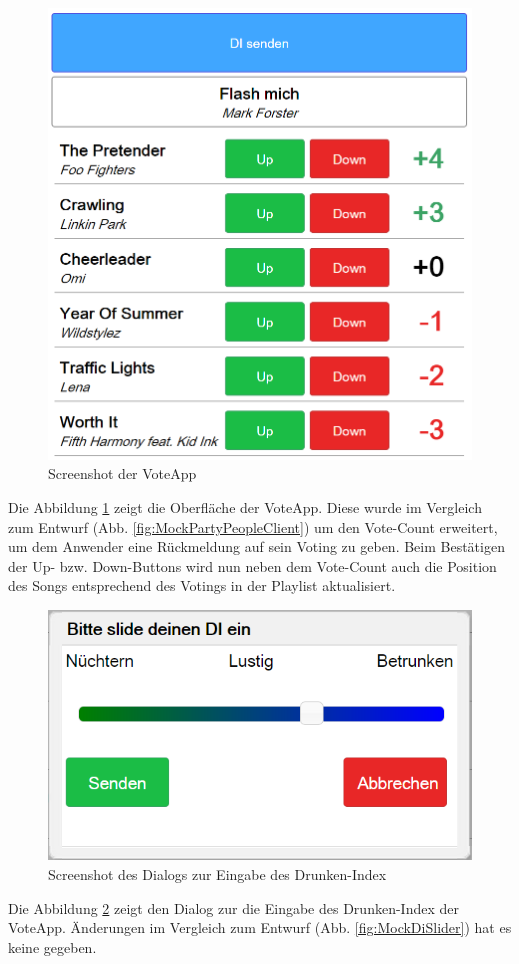 \begin{figure}[H]
\centering
\includegraphics[width=0.5\linewidth]{Bilder/Screenshot-Vote-App}
\caption{Screenshot der VoteApp}
\label{fig:Screenshot-Vote-App}
\end{figure}

Die Abbildung \ref{fig:Screenshot-Vote-App} zeigt die Oberfläche der VoteApp. Diese wurde im Vergleich zum Entwurf (Abb. \ref{fig:MockPartyPeopleClient}) um den Vote-Count erweitert, um dem Anwender eine Rückmeldung auf sein Voting zu geben. Beim Bestätigen der Up- bzw. Down-Buttons wird nun neben dem Vote-Count auch die Position des Songs entsprechend des Votings in der Playlist aktualisiert.

\begin{figure}[H]
\centering
\includegraphics[width=0.5\linewidth]{Bilder/Screenshot-VoteApp-DI-Slider}
\caption{Screenshot des Dialogs zur Eingabe des Drunken-Index}
\label{fig:Screenshot-Vote-App_Slider}
\end{figure}

Die Abbildung \ref{fig:Screenshot-Vote-App_Slider} zeigt den Dialog zur die Eingabe des Drunken-Index der VoteApp. Änderungen im Vergleich zum Entwurf (Abb. \ref{fig:MockDiSlider}) hat es keine gegeben.